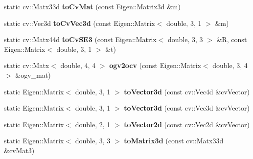 \begin{DoxyCompactItemize}
\item 
static cv\+::\+Matx33d {\bfseries to\+Cv\+Mat} (const Eigen\+::\+Matrix3d \&m)\hypertarget{classMultiColSLAM_1_1cConverter_a8e8676c3f22e7704bcb994260cb0394b}{}\label{classMultiColSLAM_1_1cConverter_a8e8676c3f22e7704bcb994260cb0394b}

\item 
static cv\+::\+Vec3d {\bfseries to\+Cv\+Vec3d} (const Eigen\+::\+Matrix$<$ double, 3, 1 $>$ \&m)\hypertarget{classMultiColSLAM_1_1cConverter_ac3e40e4e3b1e3910d87b8aacb9057cd8}{}\label{classMultiColSLAM_1_1cConverter_ac3e40e4e3b1e3910d87b8aacb9057cd8}

\item 
static cv\+::\+Matx44d {\bfseries to\+Cv\+S\+E3} (const Eigen\+::\+Matrix$<$ double, 3, 3 $>$ \&R, const Eigen\+::\+Matrix$<$ double, 3, 1 $>$ \&t)\hypertarget{classMultiColSLAM_1_1cConverter_a6726554af7a5f6e63146e79cac53735b}{}\label{classMultiColSLAM_1_1cConverter_a6726554af7a5f6e63146e79cac53735b}

\item 
static cv\+::\+Matx$<$ double, 4, 4 $>$ {\bfseries ogv2ocv} (const Eigen\+::\+Matrix$<$ double, 3, 4 $>$ \&ogv\+\_\+mat)\hypertarget{classMultiColSLAM_1_1cConverter_a649a5eb43fb99bdef381fc45b923ce0b}{}\label{classMultiColSLAM_1_1cConverter_a649a5eb43fb99bdef381fc45b923ce0b}

\item 
static Eigen\+::\+Matrix$<$ double, 3, 1 $>$ {\bfseries to\+Vector3d} (const cv\+::\+Vec4d \&cv\+Vector)\hypertarget{classMultiColSLAM_1_1cConverter_afe889d2faf26bb70e0b0b12e093fa1f2}{}\label{classMultiColSLAM_1_1cConverter_afe889d2faf26bb70e0b0b12e093fa1f2}

\item 
static Eigen\+::\+Matrix$<$ double, 3, 1 $>$ {\bfseries to\+Vector3d} (const cv\+::\+Vec3d \&cv\+Vector)\hypertarget{classMultiColSLAM_1_1cConverter_a841fb403b7e98e0957dd8cae0bd448c7}{}\label{classMultiColSLAM_1_1cConverter_a841fb403b7e98e0957dd8cae0bd448c7}

\item 
static Eigen\+::\+Matrix$<$ double, 2, 1 $>$ {\bfseries to\+Vector2d} (const cv\+::\+Vec2d \&cv\+Vector)\hypertarget{classMultiColSLAM_1_1cConverter_adf4a1e7bf272c4cb65c5a6bb08d060c3}{}\label{classMultiColSLAM_1_1cConverter_adf4a1e7bf272c4cb65c5a6bb08d060c3}

\item 
static Eigen\+::\+Matrix$<$ double, 3, 3 $>$ {\bfseries to\+Matrix3d} (const cv\+::\+Matx33d \&cv\+Mat3)\hypertarget{classMultiColSLAM_1_1cConverter_a4c3a9a7c708673beb7a972dedcc57057}{}\label{classMultiColSLAM_1_1cConverter_a4c3a9a7c708673beb7a972dedcc57057}


\end{DoxyCompactItemize}
